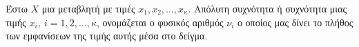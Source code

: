 Έστω $ X $ μια μεταβλητή με τιμές $ x_1,x_2,\ldots,x_{\kappa} $. Απόλυτη συχνότητα ή συχνότητα μιας τιμής $ x_i,\ i=1,2,\ldots,\kappa $, ονομάζεται ο φυσικός αριθμός $ \nu_i $ ο οποίος μας δίνει το πλήθος των εμφανίσεων της τιμής αυτής μέσα στο δείγμα.
